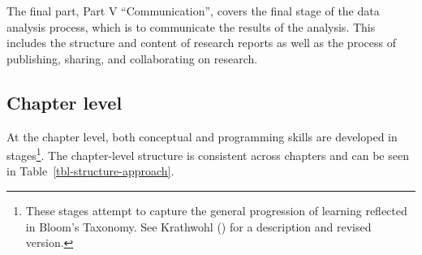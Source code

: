 \documentclass[
  letterpaper,
  krantz1]{latex/krantz-mod}
\theoremstyle{definition}
\theoremstyle{definition}
\theoremstyle{remark}
\begin{document}
The final part, Part V ``Communication'', covers the final stage of the
data analysis process, which is to communicate the results of the
analysis. This includes the structure and content of research reports as
well as the process of publishing, sharing, and collaborating on
research.

\subsection*{Chapter level}\label{sec-preface-structure-chapter}

At the chapter level, both conceptual and programming skills are
developed in stages\footnote{These stages attempt to capture the general
  progression of learning reflected in Bloom's Taxonomy. See Krathwohl
  () for a description and revised
  version.}. The chapter-level structure is consistent across chapters
and can be seen in Table~\ref{tbl-structure-approach}.
\end{document}
